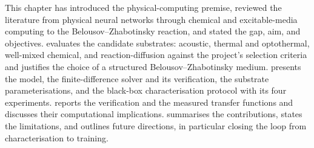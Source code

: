 This chapter has introduced the physical-computing premise, reviewed the literature from physical neural networks through chemical and excitable-media computing to the Belousov--Zhabotinsky reaction, and stated the gap, aim, and objectives.
 evaluates the candidate substrates: acoustic, thermal and optothermal, well-mixed chemical, and reaction-diffusion against the project's selection criteria and justifies the choice of a structured Belousov--Zhabotinsky medium.
 presents the model, the finite-difference solver and its verification, the substrate parameterisations, and the black-box characterisation protocol with its four experiments.
 reports the verification and the measured transfer functions and discusses their computational implications.
 summarises the contributions, states the limitations, and outlines future directions, in particular closing the loop from characterisation to training.
